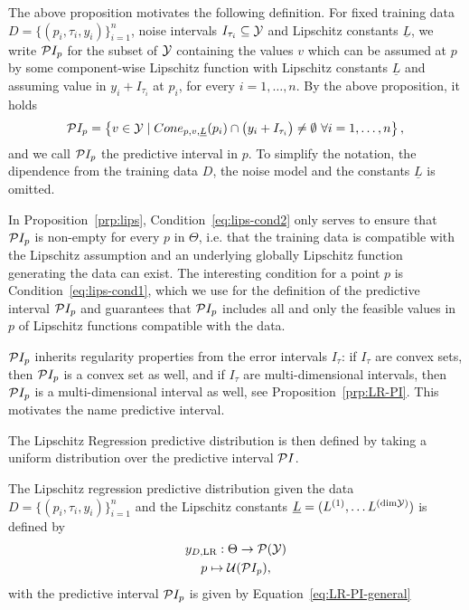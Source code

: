 The above proposition motivates the following definition.
For fixed training data $D =\{(p_i, \tau_i, y_i)\}_{i=1}^n $, noise intervals $I_{\tau_i} \subseteq \mathcal Y$ and Lipschitz constants $\underline L$, we write $\mathcal P I_p$ for the subset of $\mathcal Y$ containing the values $v$ which can be assumed at $p$ by some component-wise Lipschitz function with Lipschitz constants $\underline L$ and assuming value in $y_i + I_{\tau_i}$ at $p_i$, for every $i=1, \dots, n$.  \newline
By the above proposition, it holds
\begin{equation}\label{eq:LR-PI-general}
    \mathcal PI_p = \left \{ v \in \mathcal Y \mid Cone_{p,v,\underline L}(p_i) \cap  \big ( y_i + I_{\tau_i} \big ) \neq \emptyset \ \forall i = 1, \dots, n \right \},
\end{equation}
and we call $\mathcal P I_p$ the predictive interval in $p$.
To simplify the notation, the dipendence from the training data $D$, the noise model and the constants $\underline L$ is omitted.
\begin{rmk}
    In Proposition~\ref{prp:lips}, Condition~\eqref{eq:lips-cond2} only serves to ensure that $\mathcal PI_p$ is non-empty for every $p$ in $\Theta$, i.e. that the training data is compatible with the Lipschitz assumption and an underlying globally Lipschitz function generating the data can exist. \newline
    The interesting condition for a point $p$ is Condition~\eqref{eq:lips-cond1}, which we use for the definition of the predictive interval $\mathcal PI_p$ and guarantees that $\mathcal PI_p$ includes all and only the feasible values in $p$ of Lipschitz functions compatible with the data.
\end{rmk}
\begin{rmk}
    $\mathcal PI_p$ inherits regularity properties from the error intervals $I_\tau$: if $I_\tau$ are convex sets, then $\mathcal PI_p$ is a convex set as well, and if $I_\tau$ are multi-dimensional intervals, then $\mathcal PI_p$ is a multi-dimensional interval as well, see Proposition~\ref{prp:LR-PI}. 
    This motivates the name predictive interval. 
\end{rmk}

The Lipschitz Regression predictive distribution is then defined by taking a uniform distribution over the predictive interval $\mathcal P I$.
\begin{dfn}  \label{dfn:LR}
    The Lipschitz regression predictive distribution given the data $D=\{ (p_i, \tau_i, y_i) \}_{i=1}^n$ and the Lipschitz constants $\underline{L} = (L^{(1)},\dots L^{(\text{dim}\mathcal Y)})$ is defined by
    \begin{gather*}
        y_{D, \text{LR}} : \Theta \rightarrow \mathcal P( \mathcal Y) \\
        p \mapsto \mathcal U( \mathcal PI_p ),
    \end{gather*}
    with the predictive interval $\mathcal PI_p$ is given by Equation~\eqref{eq:LR-PI-general}
\end{dfn}

